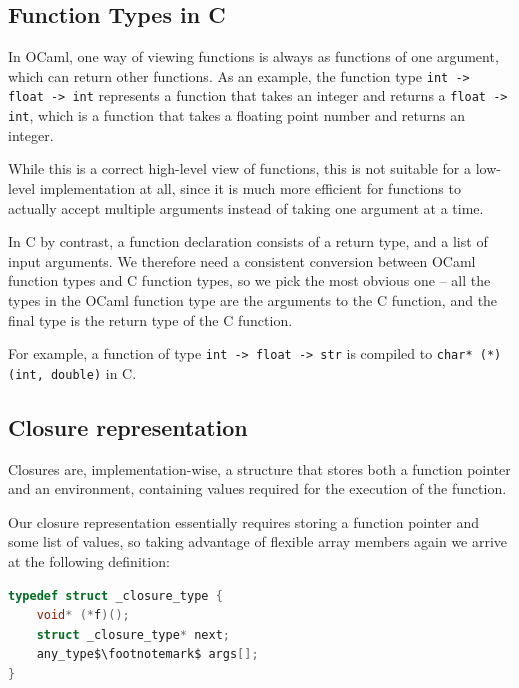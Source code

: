 \subsection{Function Types in C}\label{function-typing}

In OCaml, one way of viewing functions is always as functions of one argument,
which can return other functions. As an example, the function type \texttt{int
-> float -> int} represents a function that takes an integer and returns a
\texttt{float -> int}, which is a function that takes a floating point number
and returns an integer.

While this is a correct high-level view of functions, this is not suitable for a
low-level implementation at all, since it is much more efficient for functions
to actually accept multiple arguments instead of taking one argument at a time.

In C by contrast, a function declaration consists of a return type, and a list 
of input arguments. We therefore need a consistent conversion between OCaml 
function types and C function types, so we pick the most obvious one -- all the 
types in the OCaml function type are the arguments to the C function, and the 
final type is the return type of the C function.

For example, a function of type \texttt{int -> float -> str} is compiled to
\texttt{char* (*)(int, double)} in C.

\subsection{Closure representation}

Closures are, implementation-wise, a structure that stores both a function 
pointer and an environment, containing values required for the execution of the 
function.

Our closure representation essentially requires storing a function pointer and 
some list of values, so taking advantage of flexible array members again we 
arrive at the following definition:

\begin{lstlisting}[language=C]
typedef struct _closure_type {
    void* (*f)();
    struct _closure_type* next;
    any_type$\footnotemark$ args[];
}
\end{lstlisting}


